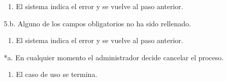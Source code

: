 \documentclass{book}
\begin{document}
\begin{itemize}
\begin{itemize}
		\begin{enumerate}
		\item El sistema indica el error y se vuelve al paso anterior.
		\end{enumerate}
	\item[5.b.] Alguno de los campos obligatorios no ha sido rellenado.
		\begin{enumerate}
		\item El sistema indica el error y se vuelve al paso anterior.
		\end{enumerate}	
	\item[*a.] En cualquier momento el administrador decide cancelar el proceso.
		\begin{enumerate}
		\item El caso de uso se termina.
		\end{enumerate}
	\end{itemize}
\end{itemize}
\end{document}
